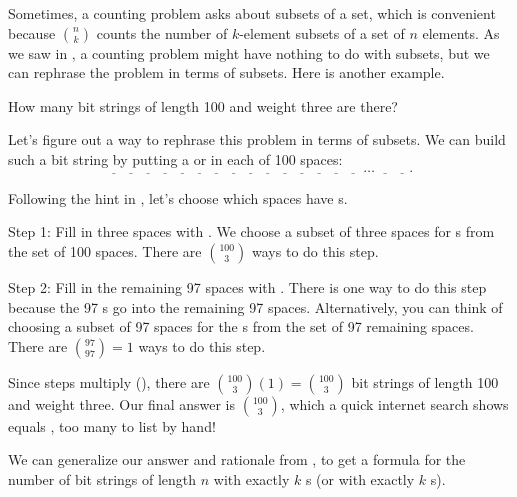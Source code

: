 Sometimes, a counting problem asks about subsets of a set, which is convenient because $\binom{n}{k}$ counts the number of $k$-element subsets of a set of $n$ elements. As we saw in , a counting problem might have nothing to do with subsets, but we can rephrase the problem in terms of subsets.  Here is another example.

\begin{exam} 
\label{exam_bit_strings_length100_weight3}
    How many bit strings of length 100 and weight three are there?  

    \begin{soln}
        Let's figure out a way to rephrase this problem in terms of subsets.  We can build such a bit string by putting a  or  in each of 100 spaces:
        $$\underline{\quad}~\underline{\quad}~\underline{\quad}~\underline{\quad}~\underline{\quad}~\underline{\quad}~\underline{\quad}~\underline{\quad}~\underline{\quad}~\underline{\quad}~\underline{\quad}~\underline{\quad}~\underline{\quad}~\underline{\quad}~\underline{\quad}~\ldots~\underline{\quad}~\underline{\quad}.$$

        Following the hint in , let's choose which spaces have s.
        
        Step 1: Fill in three spaces with .  We choose a subset of three spaces for s from the set of 100 spaces. There are $\binom{100}{3}$ ways to do this step.

        Step 2: Fill in the remaining 97 spaces with .  There is one way to do this step because the 97 s go into the remaining 97 spaces.  Alternatively, you can think of choosing a subset of 97 spaces for the s from the set of 97 remaining spaces.  There are $\binom{97}{97} =1$ ways to do this step.

        Since steps multiply (), there are $\binom{100}{3}(1) = \binom{100}{3}$ bit strings of length 100 and weight three.  Our final answer is $\binom{100}{3}$, which a quick internet search shows equals , too many to list by hand!
    \end{soln}    
\end{exam}

We can generalize our answer and rationale from , to get a formula for the number of bit strings of length $n$ with exactly $k$ s (or with exactly $k$ s).

